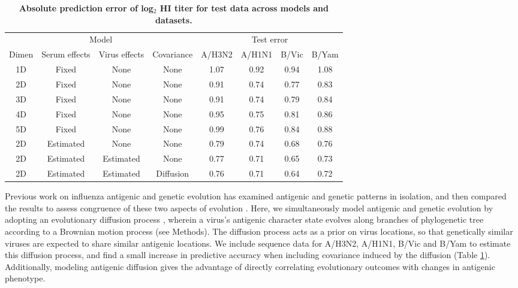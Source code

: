 \documentclass[11pt,oneside,letterpaper]{article}
\begin{document}
\begin{table}[h]
	\centering
	\caption{\textbf{Absolute prediction error of log$_2$ HI titer for test data across models and datasets.}}
	\label{errortable}		
	\begin{tabular}{ c c c c c c c c } 
	\hline
	\multicolumn{4}{c}{Model} 	&	\multicolumn{4}{c}{Test error}  \\
	Dimen 	& 	Serum effects 	&	Virus effects	& Covariance	& 	A/H3N2	& 	A/H1N1	& 	B/Vic	& 	B/Yam	\\
	\hline	
	1D 		&	Fixed 			&	None			& None			&	1.07	&	0.92	&	0.94	&	1.08	\\	
	2D 		&	Fixed 			&	None			& None			&	0.91 	&	0.74 	&	0.77	&	0.83	\\
	3D 		&	Fixed 			&	None			& None			&	0.91	&	0.74 	&	0.79	&	0.84	\\
	4D 		&	Fixed 			&	None			& None			&	0.95	&	0.75 	&	0.81	&	0.86	\\
	5D 		&	Fixed 			&	None			& None			&	0.99	&	0.76 	&	0.84	&	0.88	\\	
	2D 		&	Estimated 		&	None			& None			&	0.79	&	0.74 	&	0.68	&	0.76	\\	
	2D 		&	Estimated 		&	Estimated		& None			&	0.77	&	0.71 	&	0.65	&	0.73	\\	
	2D 		&	Estimated 		&	Estimated		& Diffusion		&	0.76	&	0.71 	&	0.64	&	0.72	\\		
	\hline
	\end{tabular}	
\end{table}

Previous work on influenza antigenic and genetic evolution has examined antigenic and genetic patterns in isolation, and then compared the results to assess congruence of these two aspects of evolution \cite{Hay01,Smith04,Russell08}. 
Here, we simultaneously model antigenic and genetic evolution by adopting an evolutionary diffusion process \cite{Lemey10}, wherein a virus's antigenic character state evolves along branches of phylogenetic tree according to a Brownian motion process (see Methods).
The diffusion process acts as a prior on virus locations, so that genetically similar viruses are expected to share similar antigenic locations.
We include sequence data for A/H3N2, A/H1N1, B/Vic and B/Yam to estimate this diffusion process, and find a small increase in predictive accuracy when including covariance induced by the diffusion (Table \ref{errortable}).
Additionally, modeling antigenic diffusion gives the advantage of directly correlating evolutionary outcomes with changes in antigenic phenotype.
\end{document}
